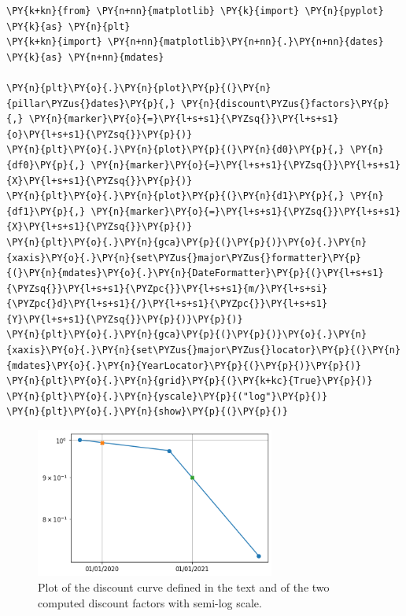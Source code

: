 \begin{codebox}
\begin{Verbatim}[commandchars=\\\{\}]
\PY{k+kn}{from} \PY{n+nn}{matplotlib} \PY{k}{import} \PY{n}{pyplot} \PY{k}{as} \PY{n}{plt}
\PY{k+kn}{import} \PY{n+nn}{matplotlib}\PY{n+nn}{.}\PY{n+nn}{dates} \PY{k}{as} \PY{n+nn}{mdates}
	
\PY{n}{plt}\PY{o}{.}\PY{n}{plot}\PY{p}{(}\PY{n}{pillar\PYZus{}dates}\PY{p}{,} \PY{n}{discount\PYZus{}factors}\PY{p}{,} \PY{n}{marker}\PY{o}{=}\PY{l+s+s1}{\PYZsq{}}\PY{l+s+s1}{o}\PY{l+s+s1}{\PYZsq{}}\PY{p}{)}
\PY{n}{plt}\PY{o}{.}\PY{n}{plot}\PY{p}{(}\PY{n}{d0}\PY{p}{,} \PY{n}{df0}\PY{p}{,} \PY{n}{marker}\PY{o}{=}\PY{l+s+s1}{\PYZsq{}}\PY{l+s+s1}{X}\PY{l+s+s1}{\PYZsq{}}\PY{p}{)}
\PY{n}{plt}\PY{o}{.}\PY{n}{plot}\PY{p}{(}\PY{n}{d1}\PY{p}{,} \PY{n}{df1}\PY{p}{,} \PY{n}{marker}\PY{o}{=}\PY{l+s+s1}{\PYZsq{}}\PY{l+s+s1}{X}\PY{l+s+s1}{\PYZsq{}}\PY{p}{)}
\PY{n}{plt}\PY{o}{.}\PY{n}{gca}\PY{p}{(}\PY{p}{)}\PY{o}{.}\PY{n}{xaxis}\PY{o}{.}\PY{n}{set\PYZus{}major\PYZus{}formatter}\PY{p}{(}\PY{n}{mdates}\PY{o}{.}\PY{n}{DateFormatter}\PY{p}{(}\PY{l+s+s1}{\PYZsq{}}\PY{l+s+s1}{\PYZpc{}}\PY{l+s+s1}{m/}\PY{l+s+si}{\PYZpc{}d}\PY{l+s+s1}{/}\PY{l+s+s1}{\PYZpc{}}\PY{l+s+s1}{Y}\PY{l+s+s1}{\PYZsq{}}\PY{p}{)}\PY{p}{)}
\PY{n}{plt}\PY{o}{.}\PY{n}{gca}\PY{p}{(}\PY{p}{)}\PY{o}{.}\PY{n}{xaxis}\PY{o}{.}\PY{n}{set\PYZus{}major\PYZus{}locator}\PY{p}{(}\PY{n}{mdates}\PY{o}{.}\PY{n}{YearLocator}\PY{p}{(}\PY{p}{)}\PY{p}{)}
\PY{n}{plt}\PY{o}{.}\PY{n}{grid}\PY{p}{(}\PY{k+kc}{True}\PY{p}{)}
\PY{n}{plt}\PY{o}{.}\PY{n}{yscale}\PY{p}{("log"}\PY{p}{)}
\PY{n}{plt}\PY{o}{.}\PY{n}{show}\PY{p}{(}\PY{p}{)}
\end{Verbatim}
\end{codebox}

\begin{figure}[htb]
	\centering
	\includegraphics[width=0.7\textwidth]{figures/log_discount_curve}
	\caption{Plot of the discount curve defined in the text and of the two computed
		discount factors with semi-log scale.}
	\label{fig:log_discount_curve}
\end{figure}

